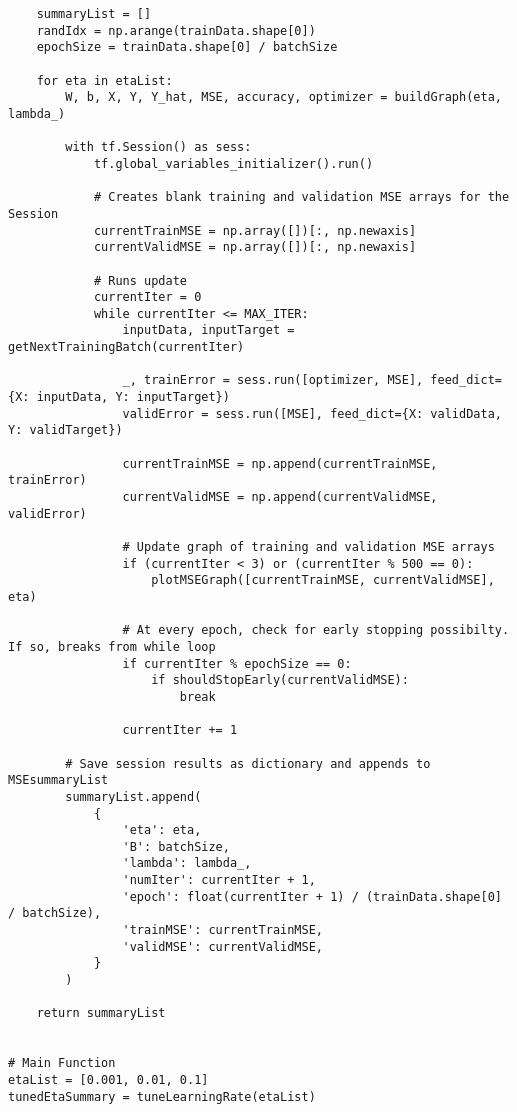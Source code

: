 \documentclass[a4paper,12pt]{article}
\begin{document}
\begin{verbatim}
    summaryList = []
    randIdx = np.arange(trainData.shape[0])
    epochSize = trainData.shape[0] / batchSize
    
    for eta in etaList:
        W, b, X, Y, Y_hat, MSE, accuracy, optimizer = buildGraph(eta, lambda_)

        with tf.Session() as sess:
            tf.global_variables_initializer().run()
            
            # Creates blank training and validation MSE arrays for the Session
            currentTrainMSE = np.array([])[:, np.newaxis]
            currentValidMSE = np.array([])[:, np.newaxis]
            
            # Runs update
            currentIter = 0
            while currentIter <= MAX_ITER:
                inputData, inputTarget = getNextTrainingBatch(currentIter)
                
                _, trainError = sess.run([optimizer, MSE], feed_dict={X: inputData, Y: inputTarget})
                validError = sess.run([MSE], feed_dict={X: validData, Y: validTarget})

                currentTrainMSE = np.append(currentTrainMSE, trainError)
                currentValidMSE = np.append(currentValidMSE, validError)
                
                # Update graph of training and validation MSE arrays
                if (currentIter < 3) or (currentIter % 500 == 0):
                    plotMSEGraph([currentTrainMSE, currentValidMSE], eta)
                
                # At every epoch, check for early stopping possibilty. If so, breaks from while loop
                if currentIter % epochSize == 0:
                    if shouldStopEarly(currentValidMSE):
                        break
                
                currentIter += 1
            
        # Save session results as dictionary and appends to MSEsummaryList
        summaryList.append(
            {
                'eta': eta,
                'B': batchSize,
                'lambda': lambda_,
                'numIter': currentIter + 1,
                'epoch': float(currentIter + 1) / (trainData.shape[0] / batchSize),
                'trainMSE': currentTrainMSE,
                'validMSE': currentValidMSE,
            }
        )
            
    return summaryList


# Main Function
etaList = [0.001, 0.01, 0.1]
tunedEtaSummary = tuneLearningRate(etaList)


\end{verbatim}
\end{document}
